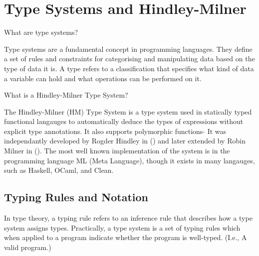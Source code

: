 \documentclass{l4proj}
\begin{document}
\section{Type Systems and Hindley-Milner}


What are type systems?

Type systems are a fundamental concept in programming languages.
They define a set of rules and constraints for categorising and manipulating data based on the type of data it is.
A type refers to a classification that specifies what kind of data a variable can hold and what operations can be performed on it.

What is a Hindley-Milner Type System?

The Hindley-Milner (HM) Type System is a type system used in statically typed functional langauges to automatically deduce the types of expressions without explicit type annotations.
It also supports polymorphic functions 
$\tilde{}$ It was independantly developed by Rogder Hindley in () and later extended by Robin Milner in ().
The most well known implementation of the system is in the programming language ML (Meta Language), though it exists in many langauges, such as Haskell, OCaml, and Clean.

\subsection{Typing Rules and Notation}

In type theory, a typing rule refers to an inference rule that describes how a type system assigns types.
Practically, a type system is a set of typing rules which when applied to a program indicate whether the program is well-typed. (I.e., A valid program.)
\end{document}
